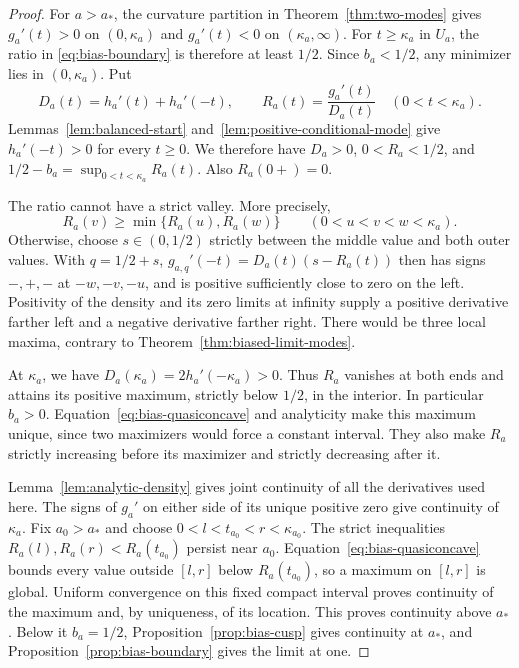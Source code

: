 \begin{proof}
For $a>a_*$, the curvature partition in Theorem~\ref{thm:two-modes}
gives $g_a'(t)>0$ on $(0,\kappa_a)$ and $g_a'(t)<0$ on
$(\kappa_a,\infty)$. For $t\ge\kappa_a$ in $U_a$, the ratio in
\eqref{eq:bias-boundary} is therefore at least $1/2$.
Since $b_a<1/2$, any minimizer lies in $(0,\kappa_a)$.
Put
\[
 D_a(t)=h_a'(t)+h_a'(-t),\qquad
 R_a(t)=\frac{g_a'(t)}{D_a(t)}\quad(0<t<\kappa_a).
\]
Lemmas~\ref{lem:balanced-start} and~\ref{lem:positive-conditional-mode}
give $h_a'(-t)>0$ for every $t\ge0$.
We therefore have $D_a>0$, $0<R_a<1/2$, and
$1/2-b_a=\sup_{0<t<\kappa_a}R_a(t)$. Also $R_a(0+)=0$.

The ratio cannot have a strict valley. More precisely,
\begin{equation}\label{eq:bias-quasiconcave}
 R_a(v)\ge\min\{R_a(u),R_a(w)\}
 \qquad(0<u<v<w<\kappa_a).
\end{equation}
Otherwise, choose $s\in(0,1/2)$ strictly between the middle value
and both outer values. With $q=1/2+s$,
$g_{a,q}'(-t)=D_a(t)(s-R_a(t))$ then has signs $-,+,-$
at $-w,-v,-u$, and is positive sufficiently close to zero on the left.
Positivity of the density
and its zero limits at infinity supply a positive derivative farther
left and a negative derivative farther right. There would be three
local maxima, contrary to Theorem~\ref{thm:biased-limit-modes}.

At $\kappa_a$, we have $D_a(\kappa_a)=2h_a'(-\kappa_a)>0$.
Thus $R_a$ vanishes at both ends and attains its positive maximum,
strictly below $1/2$, in the interior. In particular $b_a>0$.
Equation~\eqref{eq:bias-quasiconcave} and analyticity make this
maximum unique, since two maximizers would force a constant interval.
They also make $R_a$ strictly increasing before its maximizer and
strictly decreasing after it.

Lemma~\ref{lem:analytic-density} gives joint continuity of all the
derivatives used here. The signs of $g_a'$ on either side of its
unique positive zero give continuity of $\kappa_a$. Fix $a_0>a_*$
and choose
$0<l<t_{a_0}<r<\kappa_{a_0}$. The strict inequalities
$R_a(l),R_a(r)<R_a(t_{a_0})$ persist near $a_0$.
Equation~\eqref{eq:bias-quasiconcave} bounds every value outside
$[l,r]$ below $R_a(t_{a_0})$, so a maximum on $[l,r]$ is global.
Uniform convergence on this fixed compact
interval proves continuity of the maximum and, by uniqueness, of
its location. This proves continuity above $a_*$. Below it $b_a=1/2$,
Proposition~\ref{prop:bias-cusp} gives continuity at $a_*$, and
Proposition~\ref{prop:bias-boundary} gives the limit at one.


\end{proof}
